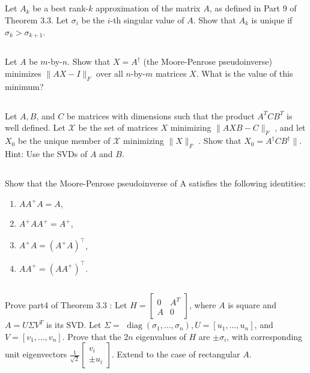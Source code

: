 \documentclass[a4paper]{ctexart}
\newcommand{\pf}{\textbf{\color{pink}{proof:}}}
\begin{document}
\pf

\subsection{}
Let $A_k$ be a best rank-$k$ approximation
 of the matrix $A$, as deﬁned in Part 9 of Theorem 3.3. Let $\sigma_i$ be the $i$-th
singular value of $A$. Show that $A_k$ is unique if $\sigma_k > \sigma_{k+1}$.

\pf

\subsection{}
Let $A$ be $m$-by-$n$. Show that $X = A^\dagger $ (the
Moore-Penrose pseudoinverse) minimizes $\|AX -I\|_F$  over all $n$-by-$m$ matrices
$X$. What is the value of this minimum?

\pf

\subsection{}
Let $A, B$, and $C$ be matrices with dimensions such that the product $A^T CB^T$ 
is well defined. Let $\mathcal{X}$ be the set of
matrices $X$ minimizing $ \|AXB - C\|_F$ , and let $X_0$ be the unique member of $\mathcal{X}$
minimizing $\|X\|_F$ . Show that $X_0 = A^\dagger CB^\dagger\|$. 
Hint: Use the SVDs of $A$ and $B$.

\pf

\subsection{}
Show that the Moore-Penrose pseudoinverse of A satisfies the following identities:
\begin{enumerate}
    \item $AA^+A = A$,
    \item $A^+AA^+ = A^+$,
    \item $A^+A = (A^+A)^\top$,
    \item $AA^+ = (AA^+)^\top$.
\end{enumerate}

\pf

\subsection{}
Prove part4 of Theorem $3.3$ : 
Let $H=\left[\begin{array}{cc}0& A^T \\ A &0\end{array}\right]$,
where $A$ is square and $A=U \Sigma V^T$ is its SVD. Let 
$\Sigma=$ $\operatorname{diag}\left(\sigma_1, \ldots, \sigma_n\right), U=\left[u_1, \ldots, u_n\right]$, 
and $V=\left[v_1, \ldots, v_n\right]$. Prove that the $2n$ 
eigenvalues of $H$ are $\pm \sigma_i$, with corresponding unit eigenvectors 
$\frac{1}{\sqrt{2}}\left[\begin{array}{c}v_i \\ \pm u_i\end{array}\right]$. 
Extend to the case of rectangular $A$.
\end{document}
